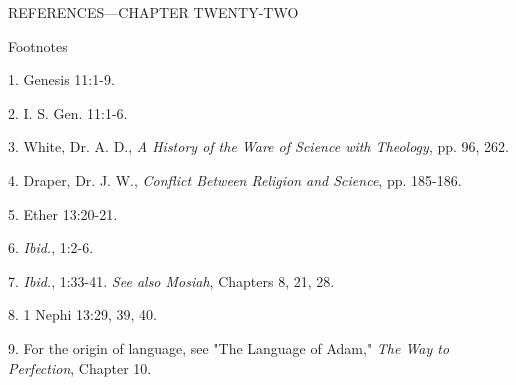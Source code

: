 \newpage
REFERENCES—CHAPTER TWENTY-TWO

Footnotes

1. Genesis 11:1-9.

2. I. S. Gen. 11:1-6.

3. White, Dr. A. D., \textit{A History of the Ware of Science with Theology}, pp. 96, 262.

4. Draper, Dr. J. W., \textit{Conflict Between Religion and Science}, pp. 185-186.

5. Ether 13:20-21.

6. \textit{Ibid.}, 1:2-6.

7. \textit{Ibid.}, 1:33-41. \textit{See also Mosiah}, Chapters 8, 21, 28.

8. 1 Nephi 13:29, 39, 40.

9. For the origin of language, see "The Language of Adam," \textit{The Way to Perfection}, Chapter
10.
